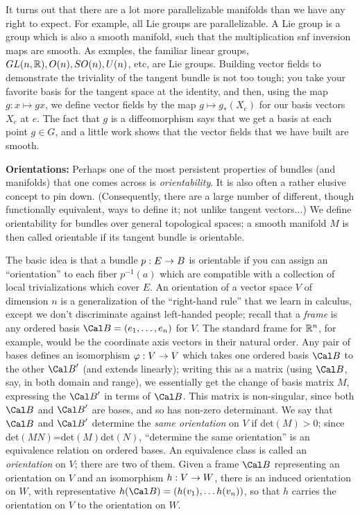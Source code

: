 \ssk

It turns out that there are a lot more parallelizable manifolds than we have any right to expect.
For example, all Lie groups are parallelizable. A Lie group is a group which is also a smooth
manifold, such that the multiplication snf inversion maps are smooth. As exmples, the familiar
linear groups, $GL(n,{\Bbb R}),O(n),SO(n),U(n)$, etc, are Lie groups. Building vector fields to
demonstrate the triviality of the tangent bundle is not too tough; you take your favorite
basis for the tangent space at the identity, and then, using the map $g:x\mapsto gx$,
we define vector fields by the map $g\mapsto g_*(X_e)$ for our basis vectors $X_e$ at $e$.
The fact that $g$ is a diffeomorphism says that we get a basis at each point $g\in G$, and a 
little work shows that the vector fields that we have built are smooth.

\msk

{\bf Orientations:} Perhaps one of the most persistent properties of bundles (and
manifolds) that one comes across is {\it orientability}. It is also often a rather
elusive concept to pin down. (Consequently, there are a large number of different, though
functionally equivalent, ways to define it; not unlike tangent vectors...) We define
orientability for bundles over general topological spaces; a smooth manifold $M$
is then called orientable if its tangent bundle is orientable. 

The basic idea is that a bundle $p:E\rightarrow B$ is orientable if you can assign an
``orientation'' to each fiber $p^{-1}(a)$ which are compatible with a collection of local 
trivializations which cover $E$. An orientation of a vector space $V$ of dimension $n$ 
is a generalization of the 
``right-hand rule'' that we learn in calculus, except we don't discriminate 
against left-handed people; recall that a {\it frame} is any ordered basis ${\Cal B}=(e_1,\ldots ,e_n)$
for $V$. The standard frame for ${\Bbb R}^n$, for example, would be the coordinate
axis vectors in their natural order. Any pair of bases defines an isomorphism
$\varphi:V\rightarrow V$ which takes one ordered basis ${\Cal B}$ to the other ${\Cal B}^\prime$
(and extends linearly); writing this as a matrix (using ${\Cal B}$, say, in both domain and
range), we essentially get the change of basis matrix $M$, expressing the ${\Cal B}^\prime$ in terms
of ${\Cal B}$. This matrix is non-singular, since both ${\Cal B}$ and ${\Cal B}^\prime$
are bases, and so has non-zero determinant. We say that ${\Cal B}$ and ${\Cal B}^\prime$ determine the
{\it same orientation} on $V$ if det$(M)>0$; since det$(MN)$=det$(M)$det$(N)$, ``determine the same
orientation'' is an equivalence relation on ordered bases. An equivalence class is called an
{\it orientation} on $V$; there are two of them. Given a frame $\Cal B$ representing an orientation on 
$V$ and an isomorphism $h:V\rightarrow W$, there is an induced orientation on $W$, with representative
$h({\Cal B})=(h(v_1),\ldots h(v_n))$, so that $h$ carries the orientation on $V$ 
to the orientation on $W$.


